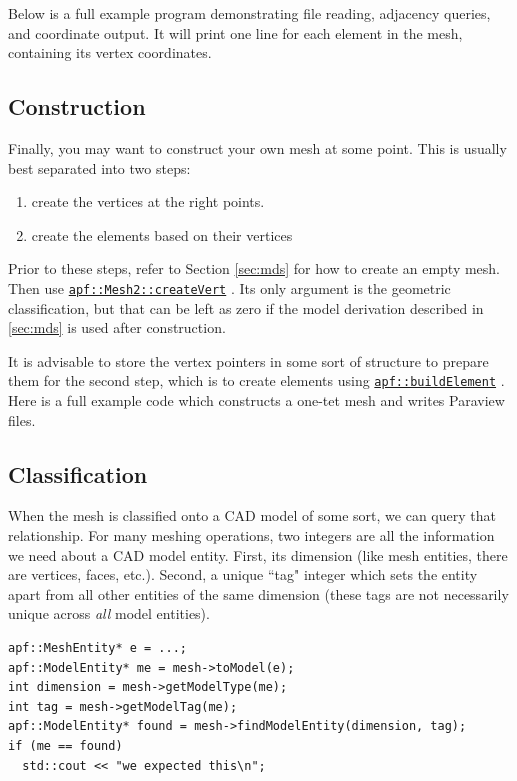 \documentclass{article}
\begin{document}
Below is a full example program demonstrating file reading,
adjacency queries, and coordinate output.
It will print one line for each element in the mesh,
containing its vertex coordinates.



\subsection{Construction}
\label{sec:gen}

Finally, you may want to construct your own mesh at
some point.
This is usually best separated into two steps:
\begin{enumerate}
\item create the vertices at the right points.
\item create the elements based on their vertices
\end{enumerate}

Prior to these steps, refer to Section \ref{sec:mds} for
how to create an empty mesh.
Then use
\href{http://scorec.rpi.edu/~dibanez/core/classapf_1_1Mesh2.html#ae7a58e9d51c9a683506d83e69416482d}{\texttt{apf::Mesh2::createVert}}
.
Its only argument is the geometric classification, but
that can be left as zero if the model derivation described
in \ref{sec:mds} is used after construction.

It is advisable to store the vertex pointers in some sort
of structure to prepare them for the second step,
which is to create elements using
\href{http://scorec.rpi.edu/~dibanez/core/namespaceapf.html#ae4a6608901d851a5d760bef899ca8e4a}{\texttt{apf::buildElement}}
.
Here is a full example code which constructs a one-tet
mesh and writes Paraview files.



\subsection{Classification}

When the mesh is classified onto a CAD model of some sort, we
can query that relationship.
For many meshing operations, two integers are all the information
we need about a CAD model entity.
First, its dimension (like mesh entities, there are vertices, faces, etc.).
Second, a unique ``tag" integer which sets the entity apart from
all other entities of the same dimension (these tags are not necessarily
unique across \emph{all} model entities).

\begin{lstlisting}
apf::MeshEntity* e = ...;
apf::ModelEntity* me = mesh->toModel(e);
int dimension = mesh->getModelType(me);
int tag = mesh->getModelTag(me);
apf::ModelEntity* found = mesh->findModelEntity(dimension, tag);
if (me == found)
  std::cout << "we expected this\n";
\end{lstlisting}
\end{document}
